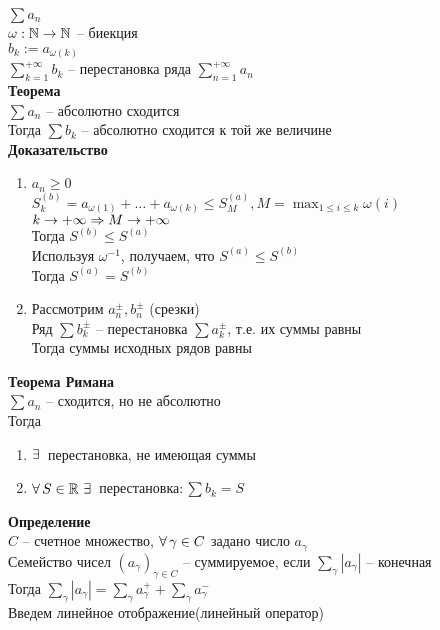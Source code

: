 \documentclass[12pt]{article}
\begin{document}
\begin{enumerate}
    $\sum a_n$\\
    $\omega: \mathbb{N} \rightarrow \mathbb{N}$ -- биекция\\
    $b_k := a_{\omega(k)}$\\
    $\sum_{k=1}^{+\infty} b_k$ -- перестановка ряда $\sum_{n=1}^{+\infty} a_n$\\
    \textbf{Теорема}\\
    $\sum a_n$ -- абсолютно сходится\\
    Тогда $\sum b_k$ -- абсолютно сходится к той же величине\\
    \textbf{Доказательство}
    \begin{enumerate}
        \item $a_n \geq 0$\\
        $S_k^{(b)} = a_{\omega(1)} + \ldots + a_{\omega(k)} \leq S_M^{(a)}, M = \max_{1 \leq i \leq k} \omega(i)$\\
        $k\rightarrow +\infty \Rightarrow M \rightarrow +\infty$\\
        Тогда $S^{(b)} \leq S^{(a)}$\\
        Используя $\omega^{-1}$, получаем, что $S^{(a)} \leq S^{(b)}$\\
        Тогда $S^{(a)} = S^{(b)}$
        \item Рассмотрим $a_n^\pm, b_n^\pm$ (срезки)\\
        Ряд $\sum b_k^\pm$ -- перестановка $\sum a_k^\pm$, т.е. их суммы равны\\
        Тогда суммы исходных рядов равны
    \end{enumerate}
    \textbf{Теорема Римана}\\
    $\sum a_n$ -- сходится, но не абсолютно\\
    Тогда \begin{enumerate}
        \item $\exists\,$ перестановка, не имеющая суммы
        \item $\forall\, S \in \mathbb{R}\ \exists\, $ перестановка$: \sum b_k = S$
    \end{enumerate}
\end{enumerate}
\textbf{Определение}\\
$C$ -- счетное множество, $\forall\, \gamma \in C$ задано число $a_\gamma$\\
Семейство чисел $(a_\gamma)_{\gamma \in C}$ -- суммируемое, если $\sum_{\gamma} |a_\gamma|$ -- конечная\\
Тогда $\sum_\gamma |a_\gamma| = \sum_\gamma a^+_\gamma + \sum_\gamma a^-_\gamma$\\
Введем линейное отображение(линейный оператор)\\
\end{document}
